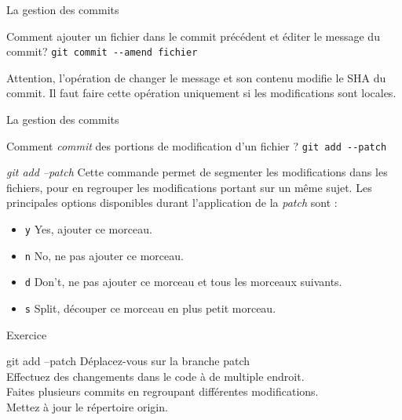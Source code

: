\documentclass[11pt]{beamer}
\begin{document}
\begin{frame}[fragile]{La gestion des commits}
	\begin{block}{Comment ajouter un fichier dans le commit précédent et éditer le message du commit?}
		\verb|git commit --amend fichier| 
		
	\end{block}
	Attention, l'opération de changer le message et son contenu modifie le SHA du commit. Il faut faire cette opération uniquement si les modifications sont locales. 
\end{frame}

\begin{frame}[fragile]{La gestion des commits}
	\begin{block}{Comment \textit{commit} des portions de modification d'un fichier ?}
		\verb|git add --patch| 
	\end{block}
\end{frame}

\begin{frame}[fragile]{\textit{git add --patch}}
	Cette commande permet de segmenter les modifications dans les fichiers, pour en regrouper les modifications portant sur un même sujet. Les principales options disponibles durant l'application de la \textit{patch} sont :
	\begin{itemize}
		\item \verb|y| Yes, ajouter ce morceau.
		\item \verb|n| No, ne pas ajouter ce morceau.
		\item \verb|d| Don't, ne pas ajouter ce morceau et tous les morceaux suivants.
		\item \verb|s| Split, découper ce morceau en plus petit morceau.
	\end{itemize}
\end{frame}

\begin{frame}[fragile]{Exercice}
	\begin{block}{git add --patch}
		Déplacez-vous sur la branche patch \\
		Effectuez des changements dans le code à de multiple endroit.\\
		Faites plusieurs commits en regroupant différentes modifications.\\
		Mettez à jour le répertoire origin.
	\end{block}
\end{frame}
\end{document}
